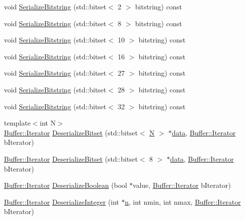 \begin{DoxyCompactItemize}
\item 
void \hyperlink{classns3_1_1Asn1Header_a1dd1172669a7f4ebb921f660b58e6a40}{Serialize\+Bitstring} (std\+::bitset$<$ 2 $>$ bitstring) const 
\item 
void \hyperlink{classns3_1_1Asn1Header_adf37ca3acd40346cf77e2e4b44e256be}{Serialize\+Bitstring} (std\+::bitset$<$ 8 $>$ bitstring) const 
\item 
void \hyperlink{classns3_1_1Asn1Header_a0abf28f5ea76e30056d167330f79d93e}{Serialize\+Bitstring} (std\+::bitset$<$ 10 $>$ bitstring) const 
\item 
void \hyperlink{classns3_1_1Asn1Header_aea560845b41d4df18cb4d5a318125c27}{Serialize\+Bitstring} (std\+::bitset$<$ 16 $>$ bitstring) const 
\item 
void \hyperlink{classns3_1_1Asn1Header_a2eb39d8ee90e3103e92a0ba6ae289baf}{Serialize\+Bitstring} (std\+::bitset$<$ 27 $>$ bitstring) const 
\item 
void \hyperlink{classns3_1_1Asn1Header_adadd4d8e6b1a2cdc06bfdf4d63cb02ed}{Serialize\+Bitstring} (std\+::bitset$<$ 28 $>$ bitstring) const 
\item 
void \hyperlink{classns3_1_1Asn1Header_abda51229de137c106f0614766ee2a551}{Serialize\+Bitstring} (std\+::bitset$<$ 32 $>$ bitstring) const 
\item 
{\footnotesize template$<$int N$>$ }\\\hyperlink{classns3_1_1Buffer_1_1Iterator}{Buffer\+::\+Iterator} \hyperlink{classns3_1_1Asn1Header_a018a0c9ee5c4d12e28cece97cc1a490a}{Deserialize\+Bitset} (std\+::bitset$<$ \hyperlink{loss__ITU1238_8m_aaa6c78b1d659f53598dbe891c1139b3e}{N} $>$ $\ast$\hyperlink{topology-example-sim_8cc_a26c65296e316af77b787dc77469bb2a4}{data}, \hyperlink{classns3_1_1Buffer_1_1Iterator}{Buffer\+::\+Iterator} b\+Iterator)
\item 
\hyperlink{classns3_1_1Buffer_1_1Iterator}{Buffer\+::\+Iterator} \hyperlink{classns3_1_1Asn1Header_a375e5665c1712973a61ce62290f52dc0}{Deserialize\+Bitset} (std\+::bitset$<$ 8 $>$ $\ast$\hyperlink{topology-example-sim_8cc_a26c65296e316af77b787dc77469bb2a4}{data}, \hyperlink{classns3_1_1Buffer_1_1Iterator}{Buffer\+::\+Iterator} b\+Iterator)
\item 
\hyperlink{classns3_1_1Buffer_1_1Iterator}{Buffer\+::\+Iterator} \hyperlink{classns3_1_1Asn1Header_ab46f4b86988a0fbeb5df11a9bc46222d}{Deserialize\+Boolean} (bool $\ast$value, \hyperlink{classns3_1_1Buffer_1_1Iterator}{Buffer\+::\+Iterator} b\+Iterator)
\item 
\hyperlink{classns3_1_1Buffer_1_1Iterator}{Buffer\+::\+Iterator} \hyperlink{classns3_1_1Asn1Header_a49802c9af30018b078150e866b6ecae2}{Deserialize\+Integer} (int $\ast$\hyperlink{lte__link__budget__x2__handover__measures_8m_abdb05bc5a064cf642a06c83b3392f148}{n}, int nmin, int nmax, \hyperlink{classns3_1_1Buffer_1_1Iterator}{Buffer\+::\+Iterator} b\+Iterator)

\end{DoxyCompactItemize}
